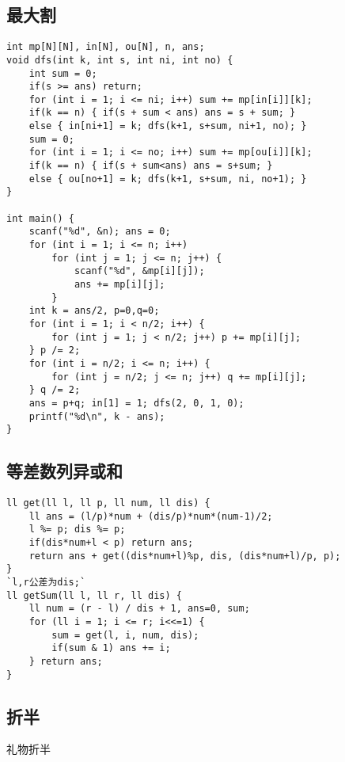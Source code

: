 \subsection{最大割}

\begin{lstlisting}
int mp[N][N], in[N], ou[N], n, ans;
void dfs(int k, int s, int ni, int no) {
    int sum = 0;
    if(s >= ans) return;
    for (int i = 1; i <= ni; i++) sum += mp[in[i]][k];
    if(k == n) { if(s + sum < ans) ans = s + sum; }
    else { in[ni+1] = k; dfs(k+1, s+sum, ni+1, no); }
    sum = 0;
    for (int i = 1; i <= no; i++) sum += mp[ou[i]][k];
    if(k == n) { if(s + sum<ans) ans = s+sum; }
    else { ou[no+1] = k; dfs(k+1, s+sum, ni, no+1); }
}

int main() {
    scanf("%d", &n); ans = 0;
    for (int i = 1; i <= n; i++)
        for (int j = 1; j <= n; j++) {
            scanf("%d", &mp[i][j]);
            ans += mp[i][j];
        }
    int k = ans/2, p=0,q=0;
    for (int i = 1; i < n/2; i++) {
        for (int j = 1; j < n/2; j++) p += mp[i][j];
    } p /= 2;
    for (int i = n/2; i <= n; i++) {
        for (int j = n/2; j <= n; j++) q += mp[i][j];
    } q /= 2;
    ans = p+q; in[1] = 1; dfs(2, 0, 1, 0);
    printf("%d\n", k - ans);
}
\end{lstlisting}


\subsection{等差数列异或和}

\begin{lstlisting}
ll get(ll l, ll p, ll num, ll dis) {
    ll ans = (l/p)*num + (dis/p)*num*(num-1)/2;
    l %= p; dis %= p;
    if(dis*num+l < p) return ans;
    return ans + get((dis*num+l)%p, dis, (dis*num+l)/p, p);
}
`l,r公差为dis;`
ll getSum(ll l, ll r, ll dis) {
    ll num = (r - l) / dis + 1, ans=0, sum;
    for (ll i = 1; i <= r; i<<=1) {
        sum = get(l, i, num, dis);
        if(sum & 1) ans += i;
    } return ans;
}
\end{lstlisting}


\subsection{折半}


礼物折半

